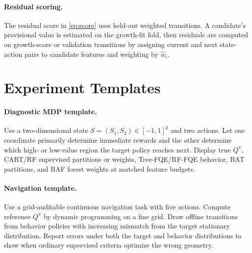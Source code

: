 \documentclass{article}
\theoremstyle{plain}
\theoremstyle{definition}
\theoremstyle{remark}
\begin{document}
\paragraph{Residual scoring.}
The residual score in \eqref{eq:score} uses held-out weighted transitions. A
candidate's provisional value is estimated on the growth-fit fold, then
residuals are computed on growth-score or validation transitions by assigning
current and next state-action pairs to candidate features and weighting by
\(\hat w_i\).

\section{Experiment Templates}
\label{app:experiment_templates}

\paragraph{Diagnostic MDP template.}
Use a two-dimensional state \(S=(S_1,S_2)\in[-1,1]^2\) and two actions. Let one
coordinate primarily determine immediate rewards and the other determine which
high- or low-value region the target policy reaches next. Display true
\(Q^\pi\), CART/RF supervised partitions or weights, Tree-FQE/RF-FQE behavior,
BAT partitions, and BAF forest weights at matched feature budgets.

\paragraph{Navigation template.}
Use a grid-auditable continuous navigation task with five actions. Compute
reference \(Q^\pi\) by dynamic programming on a fine grid. Draw offline
transitions from behavior policies with increasing mismatch from the target
stationary distribution. Report errors under both the target and behavior
distributions to show when ordinary supervised criteria optimize the wrong
geometry.
\end{document}
